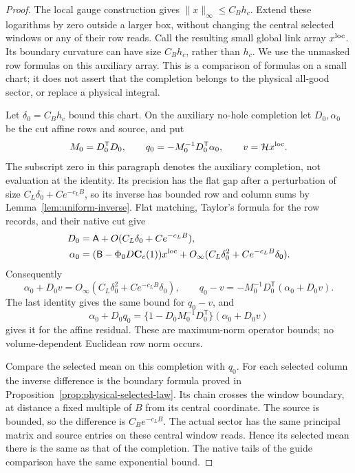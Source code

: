 \documentclass[11pt,reqno]{amsart}
\numberwithin{equation}{section}
\theoremstyle{definition}
\theoremstyle{remark}
\begin{document}
\begin{proof}
The local gauge construction gives \(\|x\|_\infty\le C_Bh_c\).
Extend these logarithms by zero outside a larger box, without
changing the central selected windows or any of their row reads.
Call the resulting small global link array \(x^{\rm loc}\).
Its boundary curvature can have size \(C_Bh_c\), rather than
\(h_c\). We use the unmasked row formulas on this auxiliary
array. This is a comparison of formulas on a small chart; it
does not assert that the completion belongs to the physical
all-good sector, or replace a physical integral.

Let \(\delta_0=C_Bh_c\) bound this chart. On the auxiliary
no-hole completion let \(D_0,\alpha_0\) be the cut affine rows
and source, and put
\[
 M_0=D_0^{\mathsf T}D_0,\qquad q_0=-M_0^{-1}D_0^{\mathsf T}\alpha_0,
                  \qquad v=\mathcal Hx^{\rm loc}.
\]
The subscript zero in this paragraph denotes the auxiliary
completion, not evaluation at the identity. Its precision has
the flat gap after a perturbation of size
\(C_L\delta_0+Ce^{-c_LB}\), so its inverse has bounded row
and column sums by Lemma~\ref{lem:uniform-inverse}.
Flat matching, Taylor's formula for the row records, and their
native cut give
\[
 \begin{split}
 D_0&=\mathsf A+O(C_L\delta_0+Ce^{-c_LB}),\\
 \alpha_0&=(\mathsf B-\Phi_0D\mathbf C_c(1))x^{\rm loc}
               +O_\infty(C_L\delta_0^2+Ce^{-c_LB}\delta_0).
 \end{split}
\]
Consequently
\[
 \alpha_0+D_0v
                 =O_\infty(C_L\delta_0^2+Ce^{-c_LB}\delta_0),
 \qquad
 q_0-v=-M_0^{-1}D_0^{\mathsf T}(\alpha_0+D_0v).
\]
The last identity gives the same bound for \(q_0-v\), and
\[
 \alpha_0+D_0q_0
 =\{1-D_0M_0^{-1}D_0^{\mathsf T}\}(\alpha_0+D_0v)
\]
gives it for the affine residual. These are maximum-norm
operator bounds; no volume-dependent Euclidean row norm occurs.

Compare the selected mean on this completion with \(q_0\).
For each selected column the inverse difference is the boundary
formula proved in Proposition~\ref{prop:physical-selected-law}.
Its chain crosses the window boundary, at distance a fixed
multiple of \(B\) from its central coordinate. The source is
bounded, so the difference is \(C_Be^{-c_LB}\). The actual
sector has the same principal matrix and source entries on
these central window reads. Hence its selected mean there is
the same as that of the completion. The native tails of the
guide comparison have the same exponential bound.


\end{proof}
\end{document}
